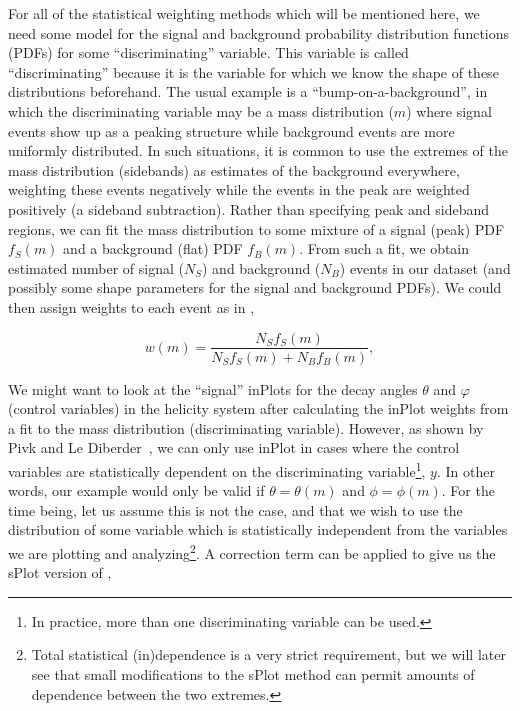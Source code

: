 For all of the statistical weighting methods which will be mentioned here, we need some model for the signal and background probability distribution functions (PDFs) for some ``discriminating'' variable. This variable is called ``discriminating'' because it is the variable for which we know the shape of these distributions beforehand. The usual example is a ``bump-on-a-background'', in which the discriminating variable may be a mass distribution ($m$) where signal events show up as a peaking structure while background events are more uniformly distributed. In such situations, it is common to use the extremes of the mass distribution (sidebands) as estimates of the background everywhere, weighting these events negatively while the events in the peak are weighted positively (a sideband subtraction). Rather than specifying peak and sideband regions, we can fit the mass distribution to some mixture of a signal (peak) PDF $f_S(m)$ and a background (flat) PDF $f_B(m)$. From such a fit, we obtain estimated number of signal ($N_S$) and background ($N_B$) events in our dataset (and possibly some shape parameters for the signal and background PDFs). We could then assign weights to each event as in ,

\begin{equation}
  w(m) = \frac{N_S f_S(m)}{N_S f_S(m) + N_B f_B(m)},
  \label{eq:inplot-weights-mass}
\end{equation}

We might want to look at the ``signal'' inPlots for the decay angles $\theta$ and $\varphi$ (control variables) in the helicity system after calculating the inPlot weights from a fit to the mass distribution (discriminating variable). However, as shown by Pivk and Le Diberder~\cite{Pivk2005}, we can only use inPlot in cases where the control variables are statistically dependent on the discriminating variable\footnote{In practice, more than one discriminating variable can be used.}, $y$. In other words, our example would only be valid if $\theta = \theta(m)$ and $\phi = \phi(m)$. For the time being, let us assume this is not the case, and that we wish to use the distribution of some variable which is statistically independent from the variables we are plotting and analyzing\footnote{Total statistical (in)dependence is a very strict requirement, but we will later see that small modifications to the sPlot method can permit amounts of dependence between the two extremes.}. A correction term can be applied to give us the sPlot version of ,

